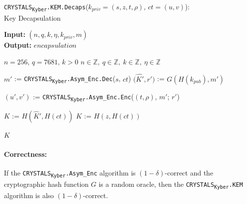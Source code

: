 \documentclass[runningheads]{llncs}
\numberwithin{equation}{section}
\begin{document}
    \begin{algorithm}
        \caption{\texorpdfstring{\texttt{CRYSTALS}\textsubscript{\texttt{Kyber}}\texttt{.KEM}\texttt{.Decaps}(${k}_{priv} = (s, z, t, \rho)$, $ct = (u, v)$)}\/:\\ \phantom{.............................................................................................}Key Decapsulation}
        \label{subrou:crystals-kyber-asymmetric-encryption-decaps}
        
        \textbf{Input:} $\left( n, q, k, \eta, {k}_{priv}, m \right)$\\
        \textbf{Output:} $ encapsulation $
  
        \begin{algorithmic}[1]
            \Require $n = 256$, $q = 7681$, $k > 0$
            \Ensure $n \in \mathbb{Z},\ q \in \mathbb{Z},\ k \in \mathbb{Z},\ \eta \in \mathbb{Z}$
            
            \vspace{2ex}
            
            \State $m'$ := \texorpdfstring{\texttt{CRYSTALS}\textsubscript{\texttt{Kyber}}\texttt{.Asym\_Enc}\texttt{.Dec}}\/($s$, $ct$)
            \State $\big( \hat{K'}, r' \big)$ := $G( H( {k}_{pub} ) , m' )$
            
            \vspace{1ex}

            \State $\left( u', v' \right)$ := \texorpdfstring{\texttt{CRYSTALS}\textsubscript{\texttt{Kyber}}\texttt{.Asym\_Enc}\texttt{.Enc}}\/($(t, \rho)$, $m'$; $r'$)
            
            \vspace{1ex}

                \State $K$ := $H(\hat{K}', H(ct))$
            \Else
                \State $K$ := $H(z, H(ct))$
            \EndIf
            
            \vspace{1ex}
            
            \State \Return $K$
        \end{algorithmic}
    \end{algorithm}

    \newpage
    
    \paragraph{\textbf{Correctness:}} If the \texorpdfstring{\texttt{CRYSTALS}\textsubscript{\texttt{Kyber}}\texttt{.Asym\_Enc}}\/ algorithm is $( 1 - \delta )$-correct and the cryptographic hash function $G$ is a random oracle, then the \texorpdfstring{\texttt{CRYSTALS}\textsubscript{\texttt{Kyber}}\texttt{.KEM}}\/ algorithm is also $( 1 - \delta )$-correct.
    
\end{document}

